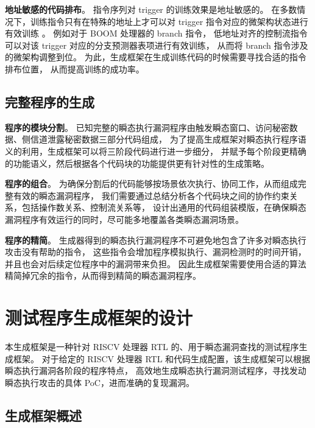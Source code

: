 \textbf{地址敏感的代码排布}。
指令序列对 trigger 的训练效果是地址敏感的。
在多数情况下，训练指令只有在特殊的地址上才可以对 trigger 指令对应的微架构状态进行有效训练 。
例如对于 BOOM 处理器\cite{celio2017boomv2}的 branch 指令，
低地址对齐的控制流指令可以对该 trigger 对应的分支预测器表项进行有效训练，
从而将 branch 指令涉及的微架构调整到位。
为此，生成框架在生成训练代码的时候需要寻找合适的指令排布位置，
从而提高训练的成功率。 \par

\subsection{完整程序的生成}

\textbf{程序的模块分割}。
已知完整的瞬态执行漏洞程序由触发瞬态窗口、访问秘密数据、侧信道泄露秘密数据三部分代码组成，
为了提高生成框架对瞬态执行程序语义的利用，生成框架可以将三阶段代码进行进一步细分，
并赋予每个阶段更精确的功能语义，然后根据各个代码块的功能提供更有针对性的生成策略。\par

\textbf{程序的组合}。
为确保分割后的代码能够按场景依次执行、协同工作，从而组成完整有效的瞬态漏洞程序，
我们需要通过总结分析各个代码块之间的协作约束关系，包括操作数关系、控制流关系等，
设计出通用的代码组装模版，在确保瞬态漏洞程序有效运行的同时，尽可能多地覆盖各类瞬态漏洞场景。\par

\textbf{程序的精简}。
生成器得到的瞬态执行漏洞程序不可避免地包含了许多对瞬态执行攻击没有帮助的指令，
这些指令会增加程序模拟执行、漏洞检测时的时间开销，并且也会对后续定位程序中的漏洞带来负担。
因此生成框架需要使用合适的算法精简掉冗余的指令，从而得到精简的瞬态漏洞程序。\par

\cleardoublepage
\section{测试程序生成框架的设计}

本生成框架是一种针对 RISCV 处理器 RTL 的、用于瞬态漏洞查找的测试程序生成框架。
对于给定的 RISCV 处理器 RTL 和代码生成配置，该生成框架可以根据瞬态执行漏洞各阶段的程序特点，
高效地生成瞬态执行漏洞测试程序，寻找发动瞬态执行攻击的具体 PoC，进而准确的复现漏洞。 \par

\subsection{生成框架概述}

